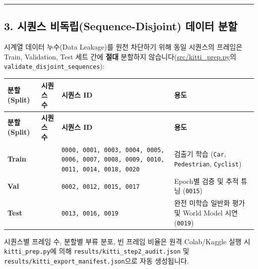 \documentclass[10.5pt,a4paper]{article}
\begin{document}
\par\noindent\rule{\textwidth}{0.4pt}\par\medskip

\subsection{3. 시퀀스 비독립(Sequence-Disjoint) 데이터 분할}

시계열 데이터 누수(Data Leakage)를 원천 차단하기 위해 동일 시퀀스의 프레임은 Train, Validation, Test 세트 간에 \textbf{절대} 분할하지 않습니다(\href{https://github.com/Heisnotanimposter/Totalcare\_autonomous\_driving\_Yolov5/blob/main/src/kitti\_prep.py}{src/kitti\_prep.py}의 \texttt{validate\_\allowbreak{}disjoint\_\allowbreak{}sequences}):



\begin{footnotesize}
\setlength{\tabcolsep}{4pt}
\setlength{\LTleft}{0pt}\setlength{\LTright}{0pt}
\begin{longtable}{>{\raggedright\arraybackslash}p{} >{\raggedright\arraybackslash}p{} >{\raggedright\arraybackslash}p{} >{\raggedright\arraybackslash}p{}}
\toprule
\textbf{분할(Split)} & \textbf{시퀀스 수} & \textbf{시퀀스 ID} & \textbf{용도} \\
\midrule
\endfirsthead
\toprule
\textbf{분할(Split)} & \textbf{시퀀스 수} & \textbf{시퀀스 ID} & \textbf{용도} \\
\midrule
\endhead
\bottomrule
\endfoot
\textbf{Train} & 14 & \texttt{0000,\allowbreak{} 0001,\allowbreak{} 0003,\allowbreak{} 0004,\allowbreak{} 0005,\allowbreak{} 0006,\allowbreak{} 0007,\allowbreak{} 0008,\allowbreak{} 0009,\allowbreak{} 0010,\allowbreak{} 0011,\allowbreak{} 0014,\allowbreak{} 0018,\allowbreak{} 0020} & 검출기 학습 (\texttt{Car}, \texttt{Pedestrian}, \texttt{Cyclist}) \\
\textbf{Val} & 4 & \texttt{0002,\allowbreak{} 0012,\allowbreak{} 0015,\allowbreak{} 0017} & Epoch별 검증 및 추적 튜닝 (\texttt{0015}) \\
\textbf{Test} & 3 & \texttt{0013,\allowbreak{} 0016,\allowbreak{} 0019} & 완전 미학습 일반화 평가 및 World Model 시연 (\texttt{0019}) \\
\end{longtable}
\end{footnotesize}


시퀀스별 프레임 수, 분할별 부류 분포, 빈 프레임 비율은 원격 Colab/Kaggle 실행 시 \texttt{kitti\_\allowbreak{}prep.\allowbreak{}py}에 의해 \texttt{results/\allowbreak{}kitti\_\allowbreak{}step2\_\allowbreak{}audit.\allowbreak{}json} 및 \texttt{results/\allowbreak{}kitti\_\allowbreak{}export\_\allowbreak{}manifest.\allowbreak{}json}으로 자동 생성됩니다.
\end{document}
